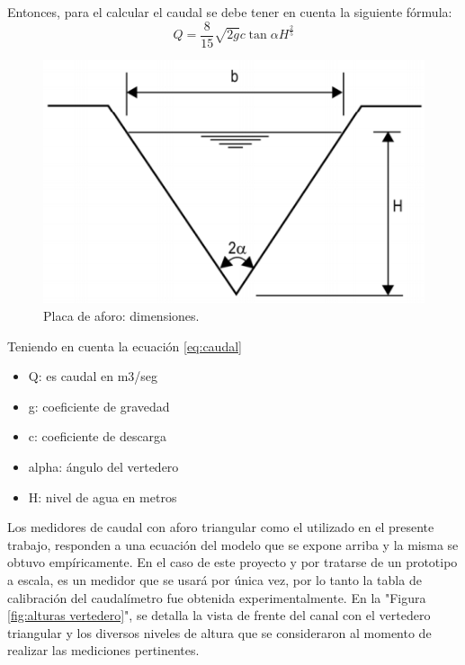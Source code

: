 Entonces, para el calcular el caudal se debe tener en cuenta la siguiente fórmula:
\begin{equation}
 \label{eq:caudal}
 Q = \frac{8}{15}\sqrt{2g} c \tan\alpha  H^\frac{2}{5} 
\end{equation}
	
\begin{figure}[htpb]
\centering
\includegraphics[scale=.75]{./Figures/DimensionesPlacaAforo.png}
\caption{Placa de aforo: dimensiones.}
\label{fig:Placa de aforo dimensiones}
\end{figure}	

Teniendo en cuenta la ecuación \ref{eq:caudal}

\begin{itemize}
\item Q: es caudal en m3/seg
\item g: coeficiente de gravedad
\item c: coeficiente de descarga
\item alpha: ángulo del vertedero
\item H: nivel de agua en metros

\end{itemize}
Los medidores de caudal con aforo triangular como el utilizado en el presente trabajo, responden a una ecuación del modelo que se expone arriba y la misma se obtuvo empíricamente. En el caso de este proyecto y por tratarse de un prototipo a escala, es un medidor que se usará por única vez, por lo tanto la tabla de calibración del caudalímetro fue obtenida experimentalmente.  
En la "Figura \ref{fig:alturas vertedero}", se detalla la vista de frente del canal con el vertedero triangular y los diversos niveles de altura que se consideraron al momento de realizar las mediciones pertinentes. 

